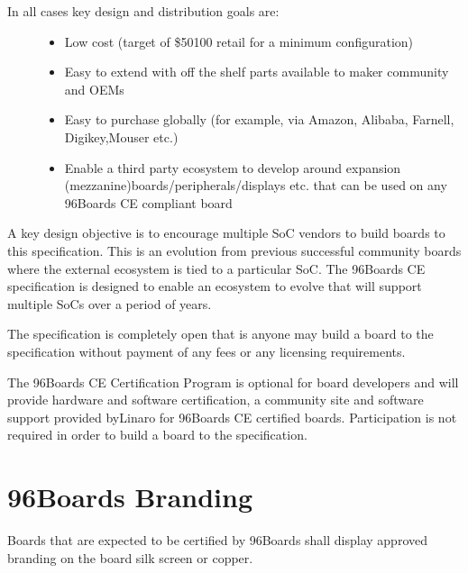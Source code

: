 \documentclass[a4paper,10pt,oneside,english]{sphinxmanual}
\begin{document}
\begin{description}
\item[{In all cases key design and distribution goals are:}] \leavevmode\begin{itemize}
\item {} 
\sphinxAtStartPar
Low cost (target of \$50\sphinxhyphen{}100 retail for a minimum configuration)

\item {} 
\sphinxAtStartPar
Easy to extend with off the shelf parts available to maker community and OEMs

\item {} 
\sphinxAtStartPar
Easy to purchase globally (for example, via Amazon, Alibaba, Farnell, Digikey,Mouser etc.)

\item {} 
\sphinxAtStartPar
Enable a third party ecosystem to develop around expansion (mezzanine)boards/peripherals/displays etc. that can be used on any 96Boards CE compliant board

\end{itemize}

\end{description}

\sphinxAtStartPar
A key design objective is to encourage multiple SoC vendors to build boards to this specification. This is an evolution from previous successful community boards where the external ecosystem is tied to a particular SoC. The 96Boards CE specification is designed to enable an ecosystem to evolve that will support multiple SoCs over a period of years.

\sphinxAtStartPar
The specification is completely open \sphinxhyphen{} that is anyone may build a board to the specification without payment of any fees or any licensing requirements.

\sphinxAtStartPar
The 96Boards CE Certification Program is optional for board developers and will provide hardware and software certification, a community site and software support provided byLinaro for 96Boards CE certified boards. Participation is not required in order to build a board to the specification.


\section{96Boards Branding}
\label{\detokenize{chapter1-ce:boards-branding}}
\sphinxAtStartPar
Boards that are expected to be certified by 96Boards shall display approved branding on the board silk screen or copper.
\end{document}
